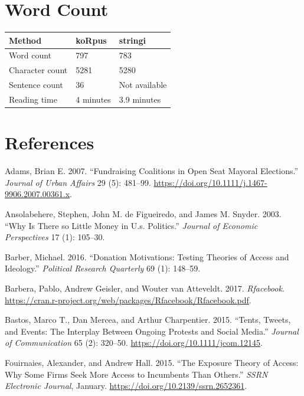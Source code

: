 \documentclass[12pt,]{article}
\begin{document}
\hypertarget{word-count}{%
\section{Word Count}\label{word-count}}

\begin{longtable}[]{@{}lll@{}}
\toprule
Method & koRpus & stringi\tabularnewline
\midrule
\endhead
Word count & 797 & 783\tabularnewline
Character count & 5281 & 5280\tabularnewline
Sentence count & 36 & Not available\tabularnewline
Reading time & 4 minutes & 3.9 minutes\tabularnewline
\bottomrule
\end{longtable}

\hypertarget{references}{%
\section*{References}\label{references}}

\hypertarget{refs}{}
\leavevmode\hypertarget{ref-adams2016}{}%
Adams, Brian E. 2007. ``Fundraising Coalitions in Open Seat Mayoral
Elections.'' \emph{Journal of Urban Affairs} 29 (5): 481--99.
\url{https://doi.org/10.1111/j.1467-9906.2007.00361.x}.

\leavevmode\hypertarget{ref-ansolabehere2003}{}%
Ansolabehere, Stephen, John M. de Figueiredo, and James M. Snyder. 2003.
``Why Is There so Little Money in U.s. Politics.'' \emph{Journal of
Economic Perspectives} 17 (1): 105--30.

\leavevmode\hypertarget{ref-barber2016}{}%
Barber, Michael. 2016. ``Donation Motivations: Testing Theories of
Access and Ideology.'' \emph{Political Research Quarterly} 69 (1):
148--59.

\leavevmode\hypertarget{ref-rfacebook}{}%
Barbera, Pablo, Andrew Geisler, and Wouter van Atteveldt. 2017.
\emph{Rfacebook}.
\url{https://cran.r-project.org/web/packages/Rfacebook/Rfacebook.pdf}.

\leavevmode\hypertarget{ref-bastos2015}{}%
Bastos, Marco T., Dan Mercea, and Arthur Charpentier. 2015. ``Tents,
Tweets, and Events: The Interplay Between Ongoing Protests and Social
Media.'' \emph{Journal of Communication} 65 (2): 320--50.
\url{https://doi.org/10.1111/jcom.12145}.

\leavevmode\hypertarget{ref-fouirnaies2015}{}%
Fouirnaies, Alexander, and Andrew Hall. 2015. ``The Exposure Theory of
Access: Why Some Firms Seek More Access to Incumbents Than Others.''
\emph{SSRN Electronic Journal}, January.
\url{https://doi.org/10.2139/ssrn.2652361}.
\end{document}
